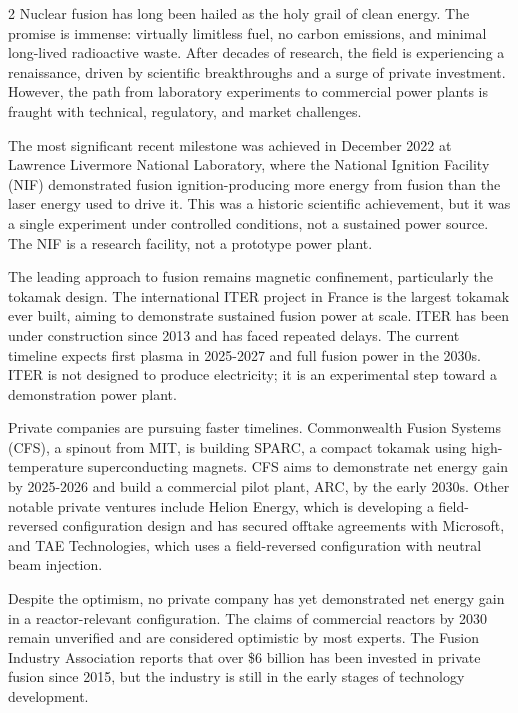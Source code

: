 \documentclass[10pt,a4paper]{article}
\begin{document}
\begin{multicols}{2}
{\small Nuclear fusion has long been hailed as the holy grail of clean energy. The promise is immense: virtually limitless fuel, no carbon emissions, and minimal long-lived radioactive waste. After decades of research, the field is experiencing a renaissance, driven by scientific breakthroughs and a surge of private investment. However, the path from laboratory experiments to commercial power plants is fraught with technical, regulatory, and market challenges.}\par
{\small The most significant recent milestone was achieved in December 2022 at Lawrence Livermore National Laboratory, where the National Ignition Facility (NIF) demonstrated fusion ignition-producing more energy from fusion than the laser energy used to drive it. This was a historic scientific achievement, but it was a single experiment under controlled conditions, not a sustained power source. The NIF is a research facility, not a prototype power plant.}\par
{\small The leading approach to fusion remains magnetic confinement, particularly the tokamak design. The international ITER project in France is the largest tokamak ever built, aiming to demonstrate sustained fusion power at scale. ITER has been under construction since 2013 and has faced repeated delays. The current timeline expects first plasma in 2025-2027 and full fusion power in the 2030s. ITER is not designed to produce electricity; it is an experimental step toward a demonstration power plant.}\par
{\small Private companies are pursuing faster timelines. Commonwealth Fusion Systems (CFS), a spinout from MIT, is building SPARC, a compact tokamak using high-temperature superconducting magnets. CFS aims to demonstrate net energy gain by 2025-2026 and build a commercial pilot plant, ARC, by the early 2030s. Other notable private ventures include Helion Energy, which is developing a field-reversed configuration design and has secured offtake agreements with Microsoft, and TAE Technologies, which uses a field-reversed configuration with neutral beam injection.}\par
{\small Despite the optimism, no private company has yet demonstrated net energy gain in a reactor-relevant configuration. The claims of commercial reactors by 2030 remain unverified and are considered optimistic by most experts. The Fusion Industry Association reports that over \$6 billion has been invested in private fusion since 2015, but the industry is still in the early stages of technology development.}\par

\end{multicols}
\end{document}
